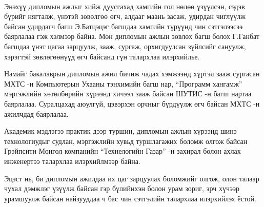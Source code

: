 
\begin{acknowledgements}
\addchaptertocentry{\acknowledgementname}

\paragraph{} Энэхүү дипломын ажлыг хийж дуусгахад хамгийн гол нөлөө үзүүлсэн, сэдэв бүрийг нягталж,  үнэтэй зөвөлгөө өгч,  алдааг маань засаж, удирдан чиглүүлж байсан удирдагч багш Э.Батцэцэг багшдаа хамгийн түрүүнд чин сэтгэлээсээ баярлалаа гэж хэлмээр байна. Мөн дипломын ажлын зөвлөх багш болох Г.Ганбат багшдаа үнэт цагаа зарцуулж, зааж, сургаж, орхигдуулсан зүйлсийг сануулж, хэрэгтэй зөвлөгөөнүүд өгч байсанд гүн талархлаа илэрхийлье.
\newline
\newline
\par Намайг бакалаврын дипломын ажил бичиж чадах хэмжээнд хүртэл зааж сургасан МХТС -н Компьютерын Ухааны тэнхимийн багш нар, “Программ хангамж” мэргэжлийн хөтөлбөрийн хүрээнд хичээл зааж байсан ШУТИС -н багш нартаа баярлалаа. Суралцахад аюулгүй, цэвэрхэн орчныг бүрдүүлж өгч байсан МХТС -н ажилчдад баярлалаа.
\newline
\newline
\par Академик мэдлэгээ практик дээр туршин, дипломын ажлын хүрээнд шинэ технологиудыг судлан, мэргэжлийн хувьд туршлагажих боломж олгож байсан Грэйпсити Монгол компанийн “Технелогийн Газар” -н захирал болон ахлах инженертээ талархлаа илэрхийлмээр байна.
\newline
\newline
\par Эцэст нь, би дипломын ажилдаа их цаг зарцуулах боломжийг олгож, олон талаар чухал дэмжлэг үзүүлж байсан гэр бүлийнхэн болон урам зориг, эрч хүчээр урамшуулж байсан найзууддаа ч бас чин сэтгэлийн талархлаа илэрхийлэх ёстой.


\end{acknowledgements}